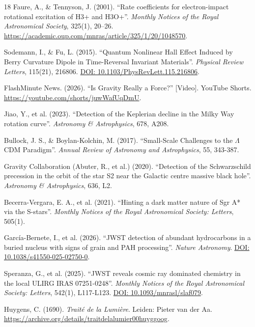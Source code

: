 \documentclass[11pt, a4paper]{article}
\newcommand{\doi}[1]{\href{https://doi.org/#1}{DOI: #1}}
\begin{document}
\begin{thebibliography}{18}
  Faure, A., \& Tennyson, J. (2001). ``Rate coefficients for electron-impact rotational excitation of H3+ and H3O+''. \textit{Monthly Notices of the Royal Astronomical Society}, 325(1), 20–26. 
  \url{https://academic.oup.com/mnras/article/325/1/20/1048570}.

  Sodemann, I., \& Fu, L. (2015). ``Quantum Nonlinear Hall Effect Induced by Berry Curvature Dipole in Time-Reversal Invariant Materials''. \textit{Physical Review Letters}, 115(21), 216806. 
  \doi{10.1103/PhysRevLett.115.216806}.

  FlashMinute News. (2026). ``Is Gravity Really a Force?'' [Video]. YouTube Shorts. \url{https://youtube.com/shorts/juwWafUqDmU}.

  Jiao, Y., et al. (2023). ``Detection of the Keplerian decline in the Milky Way rotation curve''. \textit{Astronomy \& Astrophysics}, 678, A208.

  Bullock, J. S., \& Boylan-Kolchin, M. (2017). ``Small-Scale Challenges to the $\Lambda$CDM Paradigm''. \textit{Annual Review of Astronomy and Astrophysics}, 55, 343-387.

  Gravity Collaboration (Abuter, R., et al.) (2020). ``Detection of the Schwarzschild precession in the orbit of the star S2 near the Galactic centre massive black hole''. \textit{Astronomy \& Astrophysics}, 636, L2.

  Becerra-Vergara, E. A., et al. (2021). ``Hinting a dark matter nature of Sgr A* via the S-stars''. \textit{Monthly Notices of the Royal Astronomical Society: Letters}, 505(1).

  García-Bernete, I., et al. (2026). ``JWST detection of abundant hydrocarbons in a buried nucleus with signs of grain and PAH processing''. \textit{Nature Astronomy}. 
  \doi{10.1038/s41550-025-02750-0}.

  Speranza, G., et al. (2025). ``JWST reveals cosmic ray dominated chemistry in the local ULIRG IRAS 07251-0248''. \textit{Monthly Notices of the Royal Astronomical Society: Letters}, 542(1), L117-L123.
  \doi{10.1093/mnrasl/slaf079}.

  Huygens, C. (1690). \textit{Traité de la Lumière}. Leiden: Pieter van der Aa.
  \url{https://archive.org/details/traitdelalumier00huyggoog}.

\end{thebibliography}
\end{document}
